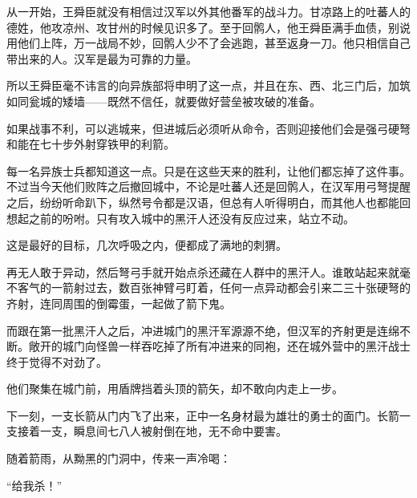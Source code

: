 从一开始，王舜臣就没有相信过汉军以外其他番军的战斗力。甘凉路上的吐蕃人的德姓，他攻凉州、攻甘州的时候见识多了。至于回鹘人，他王舜臣满手血债，别说用他们上阵，万一战局不妙，回鹘人少不了会逃跑，甚至返身一刀。他只相信自己带出来的人。汉军是最为可靠的力量。

所以王舜臣毫不讳言的向异族部将申明了这一点，并且在东、西、北三门后，加筑如同瓮城的矮墙——既然不信任，就要做好营垒被攻破的准备。

如果战事不利，可以逃城来，但进城后必须听从命令，否则迎接他们会是强弓硬弩和能在七十步外射穿铁甲的利箭。

每一名异族士兵都知道这一点。只是在这些天来的胜利，让他们都忘掉了这件事。不过当今天他们败阵之后撤回城中，不论是吐蕃人还是回鹘人，在汉军用弓弩提醒之后，纷纷听命趴下，纵然号令都是汉语，但总有人听得明白，而其他人也都能回想起之前的吩咐。只有攻入城中的黑汗人还没有反应过来，站立不动。

这是最好的目标，几次呼吸之内，便都成了满地的刺猬。

再无人敢于异动，然后弩弓手就开始点杀还藏在人群中的黑汗人。谁敢站起来就毫不客气的一箭射过去，数百张神臂弓盯着，任何一点异动都会引来二三十张硬弩的齐射，连同周围的倒霉蛋，一起做了箭下鬼。

而跟在第一批黑汗人之后，冲进城门的黑汗军源源不绝，但汉军的齐射更是连绵不断。敞开的城门向怪兽一样吞吃掉了所有冲进来的同袍，还在城外营中的黑汗战士终于觉得不对劲了。

他们聚集在城门前，用盾牌挡着头顶的箭矢，却不敢向内走上一步。

下一刻，一支长箭从门内飞了出来，正中一名身材最为雄壮的勇士的面门。长箭一支接着一支，瞬息间七八人被射倒在地，无不命中要害。

随着箭雨，从黝黑的门洞中，传来一声冷喝：

“给我杀！”
